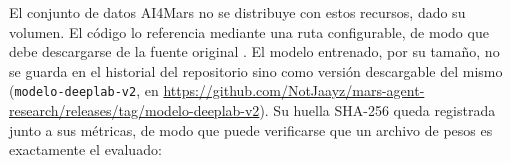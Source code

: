 El conjunto de datos AI4Mars no se distribuye con estos recursos, dado su volumen. El código
lo referencia mediante una ruta configurable, de modo que debe descargarse de la fuente
original \citep{swan2022ai4marsdata}. El modelo entrenado, por su tamaño, no se guarda en el
historial del repositorio sino como versión descargable del mismo
(\texttt{modelo-deeplab-v2}, en
\url{https://github.com/NotJaayz/mars-agent-research/releases/tag/modelo-deeplab-v2}). Su huella
SHA-256 queda registrada junto a sus métricas, de modo que puede verificarse que un archivo de
pesos es exactamente el evaluado:
\begin{center}
  \footnotesize\texttt{\cSegHashCompleto}
\end{center}
